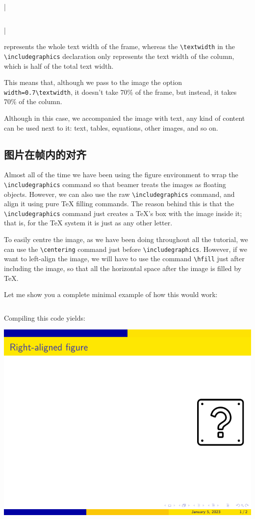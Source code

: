 |\begin{column}{0.5\textwidth}|

represents the whole text width of the frame, whereas the \verb|\textwidth| in the \verb|\includegraphics| declaration only represents the text width of the column, which is half of the total text width.

This means that, although we pass to the image the option \verb|width=0.7\textwidth|, it doesn’t take 70\% of the frame, but instead, it takes 70\% of the column.

Although in this case, we accompanied the image with text, any kind of content can be used next to it: text, tables, equations, other images, and so on.

\subsection{图片在帧内的对齐}

Almost all of the time we have been using the figure environment to wrap the \verb|\includegraphics| command so that beamer treats the images as floating objects. However, we can also use the raw \verb|\includegraphics| command, and align it using pure TeX filling commands. The reason behind this is that the \verb|\includegraphics| command just creates a {\TeX}’s box with the image inside it; that is, for the TeX system it is just as any other letter.

To easily centre the image, as we have been doing throughout all the tutorial, we can use the \verb|\centering| command just before \verb|\includegraphics|. However, if we want to left-align the image, we will have to use the command \verb|\hfill| just after including the image, so that all the horizontal space after the image is filled by {\TeX}.

Let me show you a complete minimal example of how this would work:

\inputminted[linenos=true]{latex}{examples/beamer/beamerfigure05.tex}

Compiling this code yields:

\includegraphics[page=1]{examples/beamer/beamerfigure05.pdf}


\end{column}

